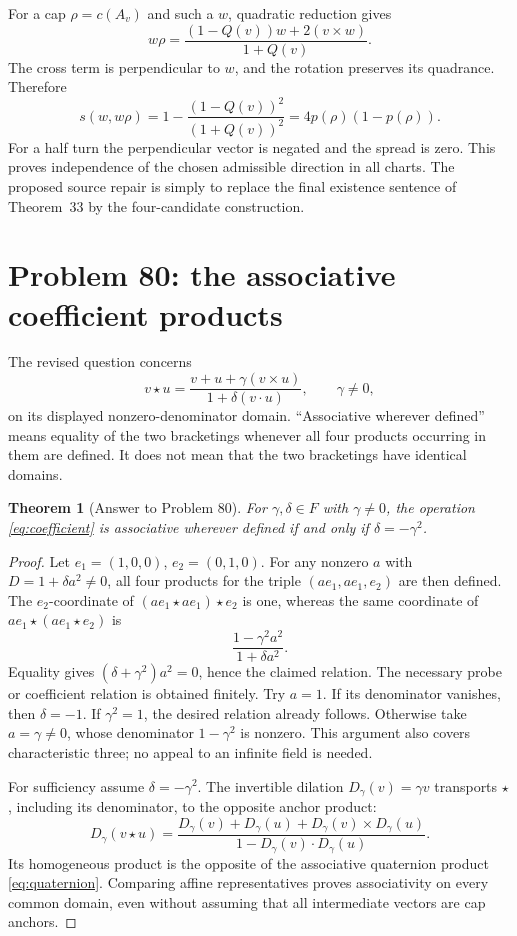 \documentclass[11pt]{article}
\newtheorem{theorem}{Theorem}[section]
\theoremstyle{remark}
\begin{document}
For a cap \(\rho=c(A_v)\) and such a \(w\), quadratic reduction gives
\[
 w\rho=\frac{(1-Q(v))w+2(v\times w)}{1+Q(v)}.
\]
The cross term is perpendicular to \(w\), and the rotation preserves its
quadrance. Therefore
\[
 s(w,w\rho)
 =1-\frac{(1-Q(v))^2}{(1+Q(v))^2}
 =4p(\rho)(1-p(\rho)).
\]
For a half turn the perpendicular vector is negated and the spread is zero.
This proves independence of the chosen admissible direction in all charts.
The proposed source repair is simply to replace the final existence sentence
of Theorem~33 by the four-candidate construction.

\section{Problem 80: the associative coefficient products}

The revised question concerns
\begin{equation}
 v\star u=\frac{v+u+\gamma(v\times u)}{1+\delta(v\cdot u)},
 \qquad\gamma\ne0,
 \label{eq:coefficient}
\end{equation}
on its displayed nonzero-denominator domain. ``Associative wherever
defined'' means equality of the two bracketings whenever all four products
occurring in them are defined. It does not mean that the two bracketings
have identical domains.

\begin{theorem}[Answer to Problem 80]
For \(\gamma,\delta\in F\) with \(\gamma\ne0\), the operation
\eqref{eq:coefficient} is associative wherever defined if and only if
\(\delta=-\gamma^2\).
\end{theorem}
\begin{proof}
Let \(e_1=(1,0,0)\), \(e_2=(0,1,0)\). For any nonzero \(a\)
with \(D=1+\delta a^2\ne0\), all four products for the triple
\((ae_1,ae_1,e_2)\) are then defined. The \(e_2\)-coordinate of
\((ae_1\star ae_1)\star e_2\) is one, whereas the same coordinate of
\(ae_1\star(ae_1\star e_2)\) is
\[
 \frac{1-\gamma^2a^2}{1+\delta a^2}.
\]
Equality gives \((\delta+\gamma^2)a^2=0\), hence the claimed relation.
The necessary probe or coefficient relation is obtained finitely. Try
\(a=1\). If its denominator vanishes, then \(\delta=-1\). If
\(\gamma^2=1\), the desired relation already follows. Otherwise take
\(a=\gamma\ne0\), whose denominator \(1-\gamma^2\) is nonzero. This
argument also covers characteristic three; no appeal to an infinite field
is needed.

For sufficiency assume \(\delta=-\gamma^2\). The invertible dilation
\(D_\gamma(v)=\gamma v\) transports \(\star\), including its denominator,
to the opposite anchor product:
\[
 D_\gamma(v\star u)=
 \frac{D_\gamma(v)+D_\gamma(u)
       +D_\gamma(v)\times D_\gamma(u)}
      {1-D_\gamma(v)\cdot D_\gamma(u)}.
\]
Its homogeneous product is the opposite of the associative quaternion
product \eqref{eq:quaternion}. Comparing affine representatives proves
associativity on every common domain, even without assuming that all
intermediate vectors are cap anchors.
\end{proof}
\end{document}
